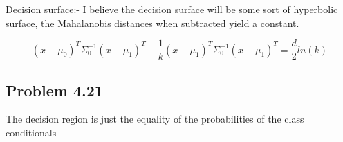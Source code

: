 Decision surface:- I believe the decision surface will be some sort of hyperbolic surface, the Mahalanobis distances when subtracted yield a  constant.

\begin{equation}
    (x - \mu_0)^T\Sigma_0^{-1}(x - \mu_1)^T - \frac{1}{k}(x - \mu_1)^T\Sigma_0^{-1}(x - \mu_1)^T =\frac{d}{2}ln(k)
\end{equation}

\subsection{Problem 4.21}
The decision region is just the equality of the probabilities of the class conditionals
